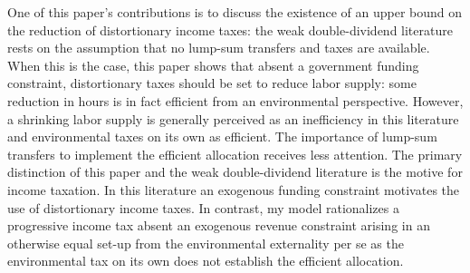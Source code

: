 One of this paper's contributions is to discuss the existence of an upper bound on the reduction of distortionary income taxes: the weak double-dividend literature rests on the assumption that no lump-sum transfers and taxes are available. When this is the case, this paper shows that absent a government funding constraint, distortionary taxes should be set to reduce labor supply: some reduction in hours is in fact efficient from an environmental perspective. However, a shrinking labor supply is generally perceived as an inefficiency in this literature and environmental taxes on its own as efficient. The importance of lump-sum transfers to implement the efficient allocation receives less attention.  %
 The primary distinction of this paper and the weak double-dividend literature is the motive for income taxation. In this literature an exogenous funding constraint motivates the use of distortionary income taxes. In contrast, my model rationalizes a progressive income tax absent an exogenous revenue constraint arising in an otherwise equal set-up from the environmental externality per se as the environmental tax on its own does not establish the efficient allocation. 





